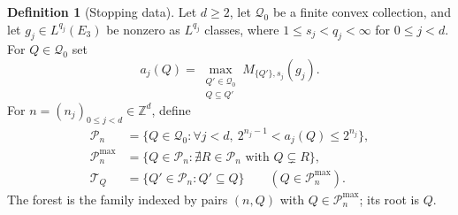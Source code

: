 \documentclass[12pt,reqno]{amsart}
\theoremstyle{plain}
\theoremstyle{definition}
\newtheorem{definition}[theorem]{Definition}
\theoremstyle{remark}
\numberwithin{equation}{section}
\newcommand{\Z}{\mathbb Z}
\newcommand{\T}{\mathcal T}
\begin{document}
\begin{definition}[Stopping data]\label{def:stopping}
Let $d\ge2$, let $\mathcal Q_0$ be a finite convex collection, and let
$g_j\in L^{q_j}(E_3)$ be nonzero as $L^{q_j}$ classes, where
$1\le s_j<q_j<\infty$ for $0\le j<d$.
For $Q\in\mathcal Q_0$ set
\begin{equation}\label{eq:stopping_data}
 a_j(Q)=\max_{\substack{Q'\in\mathcal Q_0\\Q\subseteq Q'}}
                         M_{\{Q'\},s_j}(g_j).
\end{equation}
For $n=(n_j)_{0\le j<d}\in\Z^d$, define
\begin{align}
 \mathcal P_n
 &=\{Q\in\mathcal Q_0:
       \forall j<d,\ 2^{n_j-1}<a_j(Q)\le2^{n_j}\},
                  \label{eq:stopping_levels}\\
 \mathcal P_n^{\max}
 &=\{Q\in\mathcal P_n:
       \nexists R\in\mathcal P_n\text{ with }Q\subsetneq R\},
                  \label{eq:stopping_roots}\\
 \T_Q&=\{Q'\in\mathcal P_n:Q'\subseteq Q\}
              \qquad(Q\in\mathcal P_n^{\max}).
                  \label{eq:stopping_trees}
\end{align}
The forest is the family indexed by pairs $(n,Q)$ with
$Q\in\mathcal P_n^{\max}$; its root is $Q$.
\end{definition}
\end{document}
